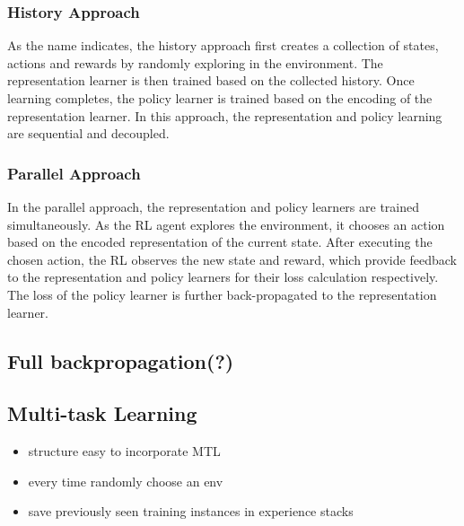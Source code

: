 \subsubsection{History Approach}
As the name indicates, the history approach first creates a collection of states, actions and rewards by randomly exploring in the environment.
The representation learner is then trained based on the collected history.
Once learning completes, the policy learner is trained based on the encoding of the representation learner.
In this approach, the representation and policy learning are sequential and decoupled. 

\subsubsection{Parallel Approach}
In the parallel approach, the representation and policy learners are trained simultaneously.
As the RL agent explores the environment, it chooses an action based on the encoded representation of the current state.
After executing the chosen action, the RL observes the new state and reward, which provide feedback to the representation and policy learners for their loss calculation respectively.
The loss of the policy learner is further back-propagated to the representation learner.

\subsection{Full backpropagation(?)}

\subsection{Multi-task Learning}
\begin{itemize}
	\item structure easy to incorporate MTL
	\item every time randomly choose an env
	\item save previously seen training instances in experience stacks
\end{itemize}